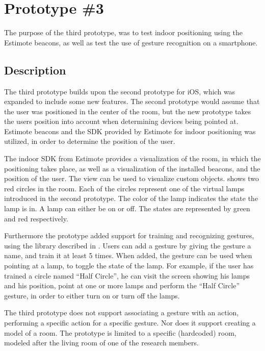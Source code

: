 \section{Prototype \#3}
\label{sec:implementation:prototypes:prototype3}

The purpose of the third prototype, 
was to test indoor positioning using the Estimote beacons, 
as well as test the use of gesture recognition on a smartphone.

\subsection{Description}
The third prototype builds upon the second prototype for iOS, 
which was expanded to include some new features. 
The second prototype would assume that the user was positioned in the center of the room, 
but the new prototype takes the users position into account when determining devices being pointed at. 
Estimote beacons and the SDK provided by Estimote for indoor positioning was utilized, 
in order to determine the position of the user.

The indoor SDK from Estimote provides a visualization of the room, 
in which the positioning takes place, 
as well as a visualization of the installed beacons, 
and the position of the user. 
The view can be used to visualize custom objects. 
 shows two red circles in the room. 
Each of the circles represent one of the virtual lamps introduced in the second prototype. 
The color of the lamp indicates the state the lamp is in. 
A lamp can either be on or off. 
The states are represented by green and red respectively.

Furthermore the prototype added support for training and recognizing gestures, 
using the \threedollar library described in .
Users can add a gesture by giving the gesture a name, 
and train it at least \num{5} times. 
When added, the gesture can be used when pointing at a lamp, 
to toggle the state of the lamp. 
For example, if the user has trained a circle named ``Half Circle'', 
he can visit the screen showing his lamps and his position, 
point at one or more lamps and perform the ``Half Circle'' gesture, 
in order to either turn on or turn off the lamps.

The third prototype does not support associating a gesture with an action, 
\ie performing a specific action for a specific gesture. 
Nor does it support creating a model of a room. 
The prototype is limited to a specific (hardcoded) room,
modeled after the living room of one of the research members.

